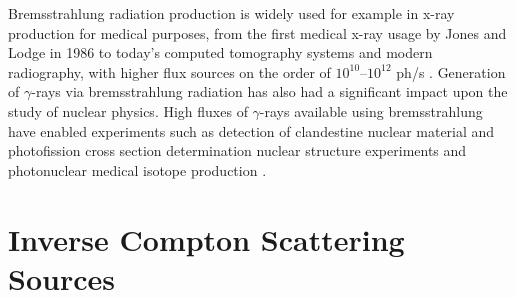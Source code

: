 \documentclass[../main.tex]{subfiles}
\begin{document}
Bremsstrahlung radiation production is widely used for example in x-ray production for medical purposes, from the first medical x-ray usage by Jones and Lodge in 1986 \cite{jones1896discovery} to today's computed tomography systems \cite{hounsfield1973computerized,cormack1963representation,cormack1964representation} and modern radiography, with higher flux sources on the order of $10^{10}$--$10^{12}$ ph/\si{\second} \cite{behling2018diagnostic}. Generation of $\gamma$-rays via bremsstrahlung radiation has also had a significant impact upon the study of nuclear physics. High fluxes of $\gamma$-rays available using bremsstrahlung have enabled experiments such as detection of clandestine nuclear material \cite{pruet2006detecting,jones2008bremsstrahlung} and photofission cross section determination nuclear structure experiments \cite{dickey1975u,naik2011mass} and photonuclear medical isotope production \cite{danon2008medical}.

\section{Inverse Compton Scattering Sources}
\label{sec:intro_ICS}
\end{document}
